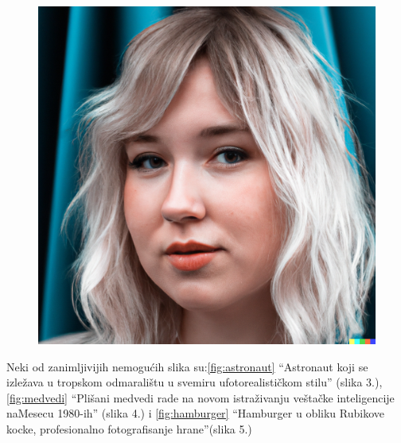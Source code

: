\documentclass[a4paper]{article}
\begin{document}
\begin{figure}[h!]
\begin{center}
\includegraphics[scale=0.10]{zena.jpg}
\end{center}
\label{fig:zena}
\end{figure}

Neki od zanimljivijih nemogućih slika su:\ref{fig:astronaut} “Astronaut koji se izležava u tropskom odmaralištu u svemiru ufotorealističkom stilu” (slika 3.), \ref{fig:medvedi} “Plišani medvedi rade na novom istraživanju veštačke inteligencije naMesecu 1980-ih” (slika 4.) i \ref{fig:hamburger} “Hamburger u obliku Rubikove kocke, profesionalno fotografisanje hrane”(slika 5.)
\end{document}
